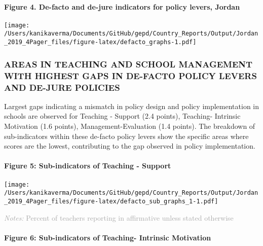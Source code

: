 \documentclass[twocolumn]{article}
\let\oldparagraph\paragraph
\renewcommand{\paragraph}[1]{\oldparagraph{#1}\mbox{}}
\begin{document}
\hypertarget{figure-4.-de-facto-and-de-jure-indicators-for-policy-levers-jordan}{%
\paragraph{Figure 4. De-facto and de-jure indicators for policy levers,
Jordan}\label{figure-4.-de-facto-and-de-jure-indicators-for-policy-levers-jordan}}

\texttt{[image: /Users/kanikaverma/Documents/GitHub/gepd/Country\_Reports/Output/Jordan\_2019\_4Pager\_files/figure-latex/defacto\_graphs-1.pdf]}

\hypertarget{areas-in-teaching-and-school-management-with-highest-gaps-in-de-facto-policy-levers-and-de-jure-policies}{%
\subsubsection{\texorpdfstring{\textbf{AREAS IN TEACHING AND SCHOOL
MANAGEMENT WITH HIGHEST GAPS IN DE-FACTO POLICY LEVERS AND DE-JURE
POLICIES}}{AREAS IN TEACHING AND SCHOOL MANAGEMENT WITH HIGHEST GAPS IN DE-FACTO POLICY LEVERS AND DE-JURE POLICIES}}\label{areas-in-teaching-and-school-management-with-highest-gaps-in-de-facto-policy-levers-and-de-jure-policies}}

Largest gaps indicating a mismatch in policy design and policy
implementation in schools are observed for Teaching - Support (2.4
points), Teaching- Intrinsic Motivation (1.6 points),
Management-Evaluation (1.4 points). The breakdown of sub-indicators
within these de-facto policy levers show the specific areas where scores
are the lowest, contributing to the gap observed in policy
implementation. \vfill\null

\hypertarget{figure-5-sub-indicators-of-teaching---support}{%
\paragraph{Figure 5: Sub-indicators of Teaching -
Support}\label{figure-5-sub-indicators-of-teaching---support}}

\texttt{[image: /Users/kanikaverma/Documents/GitHub/gepd/Country\_Reports/Output/Jordan\_2019\_4Pager\_files/figure-latex/defacto\_sub\_graphs\_1-1.pdf]}

{\scriptsize
    \textcolor{darkgray}{\textit{Notes:} Percent of teachers reporting in affirmative unless stated otherwise}
  }

\hypertarget{figure-6-sub-indicators-of-teaching--intrinsic-motivation}{%
\paragraph{Figure 6: Sub-indicators of Teaching- Intrinsic
Motivation}\label{figure-6-sub-indicators-of-teaching--intrinsic-motivation}}
\end{document}
